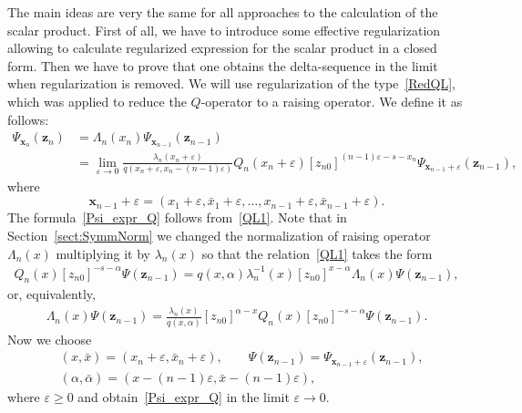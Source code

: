 \documentclass[pdftex]{sigma}
\numberwithin{equation}{section}
\begin{document}
The main ideas are very the same for all approaches to the calculation of the scalar product. First of all, we have to introduce some effective regularization allowing to calculate regularized expression for the scalar product in a closed form. Then we have to prove that one obtains the delta-sequence in the limit when regularization is removed.
We will use regularization of the type~\eqref{RedQL}, which was applied to reduce the $Q$-operator to a raising operator. We define it as follows:
\begin{align}
\nonumber
	\Psi_{\bm{x}_n}(\bm{z}_n) &= \Lambda_n(x_n) \Psi_{\bm{x}_{n-1}}(\bm{z}_{n-1}) \\
	&\label{Psi_expr_Q}
	=\lim\limits_{\varepsilon\to 0}
	\frac{\lambda_n(x_n+\varepsilon)}{q(x_n+\varepsilon, x_n-(n-1)\varepsilon)}
	Q_n(x_n+\varepsilon) [z_{n0}]^{(n-1)\varepsilon-s-x_n} \Psi_{\bm{x}_{n-1}+\varepsilon}(\bm{z}_{n-1}) ,
\end{align}
where
\begin{equation*}
\bm{x}_{n-1}+\varepsilon=(x_1+\varepsilon, \bar{x}_1+\varepsilon, \dots, x_{n-1}+\varepsilon, \bar{x}_{n-1}+\varepsilon) .
\end{equation*}
The formula~\eqref{Psi_expr_Q} follows from~\eqref{QL1}. Note that in Section~\ref{sect:SymmNorm} we changed the normalization of raising operator $\Lambda_n(x)$ multiplying it by $\lambda_n(x)$ so that the relation~\eqref{QL1} takes the form
\begin{align*}
	Q_n(x) [z_{n 0}]^{-s-\alpha} \Psi(\bm z_{n-1}) =
	q(x,\alpha) \lambda_n^{-1}(x) [z_{n0}]^{x-\alpha}
	\Lambda_n( x) \Psi(\bm z_{n-1}) ,
\end{align*}
or, equivalently,
\begin{align*}
	\Lambda_n(x) \Psi(\bm z_{n-1}) = \frac{\lambda_n(x)}{q(x,\alpha)}
	[z_{n0}]^{\alpha-x} Q_n(x) [z_{n 0}]^{-s-\alpha} \Psi(\bm z_{n-1}) .
\end{align*}
Now we choose
\begin{align*}
&(x,\bar{x})=(x_n+\varepsilon,\bar{x}_n+\varepsilon) ,\qquad \Psi(\bm z_{n-1})=\Psi_{\bm{x}_{n-1}+\varepsilon}(\bm{z}_{n-1}) , \\
&(\alpha,\bar{\alpha})=(x-(n-1)\varepsilon, \bar{x}-(n-1)\varepsilon) ,
\end{align*}
where $\varepsilon \geq 0$ and obtain~\eqref{Psi_expr_Q} in the limit $\varepsilon\to 0$.
\end{document}

